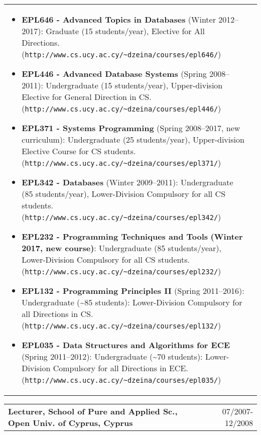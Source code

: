 \documentclass[10pt]{article}
\begin{document}
\begin{tabular*}{1.0\textwidth} {@{\extracolsep{\fill}}ll}
\parbox[t]{12.2cm}{
\setlength{\itemsep}{0.05ex}
\begin{itemize}
    \item
        {\bf EPL646 - Advanced Topics in Databases} (Winter 2012--2017):
        Graduate (15 students/year), Elective for All Directions.
        ({\tt http://www.cs.ucy.ac.cy/\~{}dzeina/courses/epl646/})
    \item 
        {\bf EPL446 - Advanced Database Systems} (Spring 2008--2011):
        Undergraduate (15 students/year), Upper-division Elective for General Direction in CS.
        ({\tt http://www.cs.ucy.ac.cy/\~{}dzeina/courses/epl446/})        
    \item {\bf EPL371 - Systems Programming} (Spring 2008--2017, new curriculum):
        Undergraduate (25 students/year), Upper-division Elective Course for CS students.
        ({\tt http://www.cs.ucy.ac.cy/\~{}dzeina/courses/epl371/})
    \item 
        {\bf EPL342 - Databases} (Winter 2009--2011):
        Undergraduate (85 students/year), Lower-Division Compulsory for all CS students.
        ({\tt http://www.cs.ucy.ac.cy/\~{}dzeina/courses/epl342/})
    \item
        {\bf EPL232 - Programming Techniques and Tools} {\bf (Winter 2017, new course)}:
        Undergraduate (85 students/year), Lower-Division Compulsory for all CS students.
        ({\tt http://www.cs.ucy.ac.cy/\~{}dzeina/courses/epl232/})
    \item
        {\bf EPL132 - Programming Principles II} (Spring 2011--2016):
        Undergraduate (\~{}85 students): Lower-Division Compulsory for all Directions in CS.
        ({\tt http://www.cs.ucy.ac.cy/\~{}dzeina/courses/epl132/})        
    \item 
        {\bf EPL035 - Data Structures and Algorithms for ECE} (Spring 2011--2012):
        Undergraduate (\~{}70 students): Lower-Division Compulsory for all Directions in ECE.
        ({\tt http://www.cs.ucy.ac.cy/\~{}dzeina/courses/epl035/})
\end{itemize}}
\end{tabular*}

\newpage
\begin{center} 
\begin{tabular*}{1.0\textwidth}%
   {@{\extracolsep{\fill}}lr}
{\bf Lecturer, School of Pure and Applied Sc., Open Univ. of Cyprus, Cyprus} 	&  	 07/2007-12/2008
\end{tabular*}
\end{center}
\end{document}
